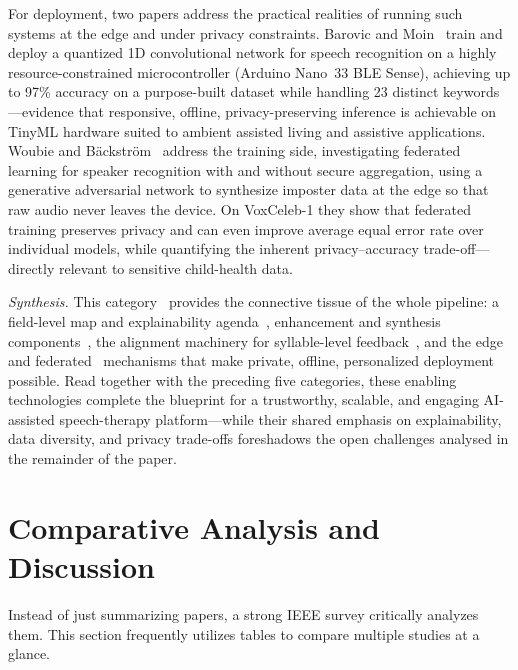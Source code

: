 \documentclass[conference]{IEEEtran}
\begin{document}
For deployment, two papers address the practical realities of running such systems at the edge and under privacy constraints. Barovic and Moin~\cite{ref23} train and deploy a quantized 1D convolutional network for speech recognition on a highly resource-constrained microcontroller (Arduino Nano~33 BLE Sense), achieving up to 97\% accuracy on a purpose-built dataset while handling 23 distinct keywords---evidence that responsive, offline, privacy-preserving inference is achievable on TinyML hardware suited to ambient assisted living and assistive applications. Woubie and B\"ackstr\"om~\cite{ref24} address the training side, investigating federated learning for speaker recognition with and without secure aggregation, using a generative adversarial network to synthesize imposter data at the edge so that raw audio never leaves the device. On VoxCeleb-1 they show that federated training preserves privacy and can even improve average equal error rate over individual models, while quantifying the inherent privacy--accuracy trade-off---directly relevant to sensitive child-health data.

\emph{Synthesis.} This category~\cite{ref20,ref21,ref22,ref23,ref24} provides the connective tissue of the whole pipeline: a field-level map and explainability agenda~\cite{ref20}, enhancement and synthesis components~\cite{ref21}, the alignment machinery for syllable-level feedback~\cite{ref22}, and the edge~\cite{ref23} and federated~\cite{ref24} mechanisms that make private, offline, personalized deployment possible. Read together with the preceding five categories, these enabling technologies complete the blueprint for a trustworthy, scalable, and engaging AI-assisted speech-therapy platform---while their shared emphasis on explainability, data diversity, and privacy trade-offs foreshadows the open challenges analysed in the remainder of the paper.

\section{Comparative Analysis and Discussion}
\label{sec:analysis}
Instead of just summarizing papers, a strong IEEE survey critically analyzes them. This section frequently utilizes tables to compare multiple studies at a glance.
\end{document}

